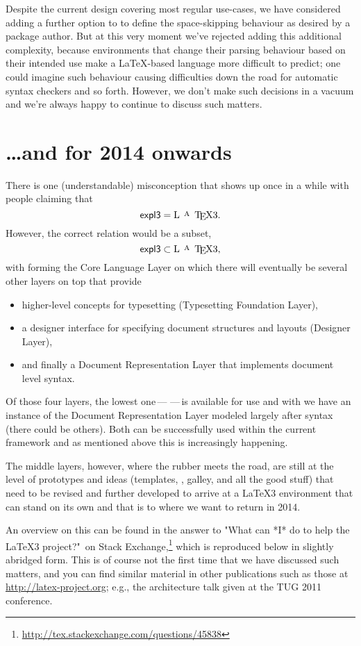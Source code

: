 \documentclass{ltnews}
\def\Dash{\,---\,}
\begin{document}
Despite the current design covering most regular use-cases, we have considered adding a further option to  to define the space-skipping behaviour as desired by a package author.
But at this very moment we've rejected adding this additional complexity, because environments that change their parsing behaviour based on their intended use make a \LaTeX-based language more difficult to predict; one could imagine such behaviour causing difficulties down the road for automatic syntax checkers and so forth.
However, we don't make such decisions in a vacuum and we're always happy to continue to discuss such matters.


\section{\ldots and for 2014 onwards}

There is one (understandable) misconception that shows up once in a while with people claiming that
\[
         \textrm{\pkg{expl3}} = \textrm{\LaTeX3}.
\]
However, the correct relation would be a subset,
\[
         \textrm{\pkg{expl3}} \subset \textrm{\LaTeX3},
\]
with  forming the Core Language Layer on which  there will eventually be several other layers on top that \mbox{provide} 
\begin{itemize}
\item higher-level concepts for typesetting (Typesetting Foundation Layer), 
\item a designer interface for specifying document structures and layouts (Designer Layer), 
\item and finally a Document Representation Layer that implements document level syntax.
\end{itemize}
Of those four layers, the lowest one\Dash{}\Dash is available for use and with  we have an instance of the Document Representation Layer modeled largely after \LaTeXe{} syntax (there could be others). Both can be successfully used within the current \LaTeXe{} framework and as mentioned above this is increasingly happening.

The middle layers, however, where the rubber meets the road, are still  at the level of prototypes and ideas (templates, , galley,  and all the good stuff) that need to be revised and further developed to arrive at a \LaTeX3 environment that can stand on its own and that is to where we want to return in 2014.

An overview on this can be found in the answer to "What can *I* do to help the \LaTeX3 project?"\ on Stack Exchange,\footnote{\url{http://tex.stackexchange.com/questions/45838}}
which is reproduced below in slightly abridged form.
This is of course not the first time that we have discussed such matters, and you can find similar material in other publications such as those at \url{http://latex-project.org}; e.g., the architecture talk given at the TUG 2011 conference.
\end{document}
